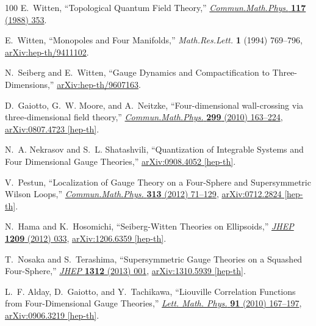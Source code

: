 \begin{thebibliography}{100}
E.~Witten, ``{Topological Quantum Field Theory},''
\href{http://dx.doi.org/10.1007/BF01223371}{{\em Commun.Math.Phys.} {\bfseries 117} (1988) 353}.

E.~Witten, ``{Monopoles and Four Manifolds},'' {\em Math.Res.Lett.} {\bfseries 1} (1994) 769--796,
\href{http://arxiv.org/abs/hep-th/9411102}{{\ttfamily arXiv:hep-th/9411102}}.

N.~Seiberg and E.~Witten, ``{Gauge Dynamics and Compactification to Three-Dimensions},''
\href{http://arxiv.org/abs/hep-th/9607163}{{\ttfamily arXiv:hep-th/9607163}}.

D.~Gaiotto, G.~W. Moore, and A.~Neitzke, ``{Four-dimensional wall-crossing via three-dimensional field theory},''
\href{http://dx.doi.org/10.1007/s00220-010-1071-2}{{\em Commun.Math.Phys.} {\bfseries 299} (2010) 163--224},
\href{http://arxiv.org/abs/0807.4723}{{\ttfamily arXiv:0807.4723 [hep-th]}}.

N.~A. Nekrasov and S.~L. Shatashvili, ``{Quantization of Integrable Systems and Four Dimensional Gauge Theories},''
\href{http://arxiv.org/abs/0908.4052}{{\ttfamily arXiv:0908.4052 [hep-th]}}.

V.~Pestun, ``{Localization of Gauge Theory on a Four-Sphere and Supersymmetric Wilson Loops},''
\href{http://dx.doi.org/10.1007/s00220-012-1485-0}{{\em Commun.Math.Phys.} {\bfseries 313} (2012) 71--129},
\href{http://arxiv.org/abs/0712.2824}{{\ttfamily arXiv:0712.2824 [hep-th]}}.

N.~Hama and K.~Hosomichi, ``{Seiberg-Witten Theories on Ellipsoids},''
\href{http://dx.doi.org/10.1007/JHEP09(2012)033, 10.1007/JHEP10(2012)051}{{\em JHEP} {\bfseries 1209} (2012) 033},
\href{http://arxiv.org/abs/1206.6359}{{\ttfamily arXiv:1206.6359 [hep-th]}}.

T.~Nosaka and S.~Terashima, ``{Supersymmetric Gauge Theories on a Squashed Four-Sphere},''
\href{http://dx.doi.org/10.1007/JHEP12(2013)001}{{\em JHEP} {\bfseries 1312} (2013) 001},
\href{http://arxiv.org/abs/1310.5939}{{\ttfamily arXiv:1310.5939 [hep-th]}}.

L.~F. Alday, D.~Gaiotto, and Y.~Tachikawa, ``{Liouville Correlation Functions from Four-Dimensional Gauge Theories},''
\href{http://dx.doi.org/10.1007/s11005-010-0369-5}{{\em Lett. Math. Phys.} {\bfseries 91} (2010) 167--197},
\href{http://arxiv.org/abs/0906.3219}{{\ttfamily arXiv:0906.3219 [hep-th]}}.


\end{thebibliography}
